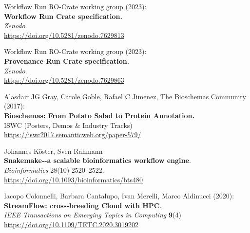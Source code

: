 \documentclass[10pt,letterpaper]{article}
\begin{document}
\begin{thebibliography}{10}
\begin{small}
 Workflow Run RO-Crate working group (2023):\\
\textbf{Workflow Run Crate specification.}\\
\emph{Zenodo}.\\
\url{https://doi.org/10.5281/zenodo.7629813}

 Workflow Run RO-Crate working group (2023):\\
\textbf{Provenance Run Crate specification.}\\
\emph{Zenodo}.\\
\url{https://doi.org/10.5281/zenodo.7629863}


Alasdair JG Gray, Carole Goble, Rafael C Jimenez, The
Bioschemas Community (2017):\\
\textbf{Bioschemas: From Potato Salad to Protein Annotation.}\\
ISWC (Posters, Demos \& Industry Tracks)\\
\url{https://iswc2017.semanticweb.org/paper-579/}



Johannes Köster, Sven Rahmann \\
\textbf{Snakemake-\/-a scalable bioinformatics workflow engine}.\\
\emph{Bioinformatics} 28(10) 2520--2522.\\
\url{https://doi.org/10.1093/bioinformatics/bts480}


Iacopo Colonnelli, Barbara Cantalupo, Ivan Merelli, Marco Aldinucci (2020):\\
\textbf{StreamFlow: cross-breeding Cloud with HPC}.\\
\emph{IEEE Transactions on Emerging Topics in Computing} \textbf{9}(4)\\
\url{https://doi.org/10.1109/TETC.2020.3019202}


\end{small}
\end{thebibliography}
\end{document}
